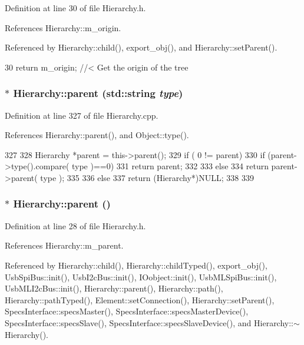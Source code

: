 Definition at line 30 of file Hierarchy.h.

References Hierarchy::m\_\-origin.

Referenced by Hierarchy::child(), export\_\-obj(), and Hierarchy::setParent().


\begin{DoxyCode}
30 { return m_origin; }  //< Get the origin of the tree
\end{DoxyCode}
\hypertarget{classHierarchy_ad550588733bf75ac5c0fcfd7c8fd11a6}{
\subsubsection[{parent}]{ $\ast$ Hierarchy::parent (std::string {\em type})}}
\label{classHierarchy_ad550588733bf75ac5c0fcfd7c8fd11a6}


Definition at line 327 of file Hierarchy.cpp.

References Hierarchy::parent(), and Object::type().


\begin{DoxyCode}
327                                             {
328   Hierarchy *parent = this->parent();
329   if ( 0 != parent){
330     if (parent->type().compare( type )==0) {
331       return parent;
332     }
333     else
334       return parent->parent( type );
335   }
336   else {
337     return (Hierarchy*)NULL;
338   }
339 }
\end{DoxyCode}
\hypertarget{classHierarchy_a1c7bec8257e717f9c1465e06ebf845fc}{
\subsubsection[{parent}]{$\ast$ Hierarchy::parent ()}}
\label{classHierarchy_a1c7bec8257e717f9c1465e06ebf845fc}


Definition at line 28 of file Hierarchy.h.

References Hierarchy::m\_\-parent.

Referenced by Hierarchy::child(), Hierarchy::childTyped(), export\_\-obj(), UsbSpiBus::init(), UsbI2cBus::init(), IOobject::init(), UsbMLSpiBus::init(), UsbMLI2cBus::init(), Hierarchy::parent(), Hierarchy::path(), Hierarchy::pathTyped(), Element::setConnection(), Hierarchy::setParent(), SpecsInterface::specsMaster(), SpecsInterface::specsMasterDevice(), SpecsInterface::specsSlave(), SpecsInterface::specsSlaveDevice(), and Hierarchy::$\sim$Hierarchy().


